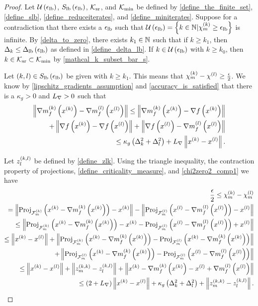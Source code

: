 \begin{proof}

Let $\ulb$, $\slb$, $\reduceiterates$, and $\miniterates$ be defined by 
\cref{define_the_finite_set}, \cref{define_slb}, \cref{define_reduceiterates}, and \cref{define_miniterates}.
Suppose for a contradiction that there exists a $\elb$ such that $\ulb = \left\{k \in \naturals | \chik \ge \elb \right\}$ is infinite.
By \cref{delta_to_zero}, there exists $k_1 \in \naturals$ such that if $k \ge k_1$, then $\dk \le \dlb$ as defined in \cref{define_delta_lb}.
If $k \in \ulb$ with $k \ge k_0$, then $k \in \reduceiterates \subset \miniterates$ by \cref{mathcal_k_subset_bar_s}.

Let $(k, l) \in \slb$ be given with $k \ge k_1$.
This means that $\chik - \chi^{(l)} \ge \frac {\epsilon} 2 $.
We know by \cref{lipschitz_gradients_assumption} and \cref{accuracy_is_satisfied} that there is a $\kappa_g > 0$ and $\lipgrad>0$ such that
\begin{align}
\left\|\gk - \gl\right\| \nonumber 
\le \left\|\gk - \gradf\left(\xk\right)\right\| \\
+ \left\|\gradf\left(\xk\right) - \gradf\left(\xl\right)\right\| 
+ \left\|\gradf\left(\xl\right) - \gl \right\| \nonumber \\
\le \kappa_g \left(\dk^2 + \dl^2\right) + \lipgrad \left\|\xk - \xl \right\|. \label{chi2zero2_comp1}
\end{align}


Let $\zlk$ be defined by \cref{define_zlk}.
Using the triangle inequality, the contraction property of projections, 
\cref{define_criticality_measure}, and \cref{chi2zero2_comp1} we have 
\begin{align*}
\frac{\epsilon}{2} \le \chik - \chi_{m}^{(l)} \\
=     \left\|\proj_{\feasiblek}\left(\xk - \gk\right) - \xk\right \| 
    - \left\|\proj_{\feasiblel}\left(\xl - \gl\right) - \xl\right \| \\
\le   \left\|\proj_{\feasiblek}\left(\xk - \gk\right) - \xk
    -  \proj_{\feasiblel}\left(\xl - \gl\right) + \xl\right \| \\
 \le  \left\|\xk - \xl\right\|
 + \left\|\proj_{\feasiblek}\left(\xk - \gk\right) -  \proj_{\feasiblel}\left(\xk - \gk\right) \right\| \\
 + \left\|\proj_{\feasiblel}\left(\xk - \gk\right) -  \proj_{\feasiblel}\left(\xl - \gl\right) \right\| \\
\le \left\|\xk - \xl\right\| + \left\|\zmk - \zlk\right\| 
+ \left\| \xk - \gk - \xl + \gl  \right\| \\
\le \left(2 + \lipgrad\right) \left\|\xk - \xl\right\| 
+ \kappa_g \left(\dk^2 + \dl^2\right)
+ \left\|\zmk - \zlk\right\|.
\end{align*}
        

\end{proof}
